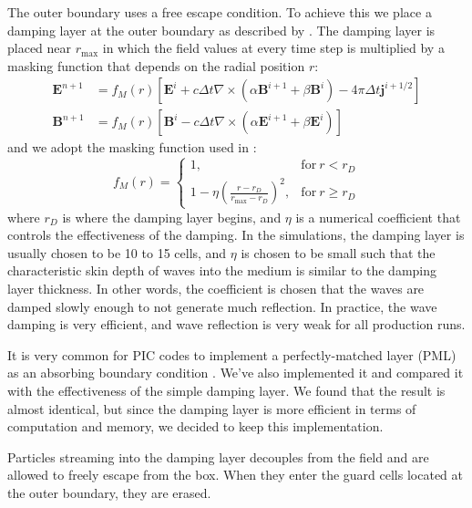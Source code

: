 The outer boundary uses a free escape condition. To achieve this we place a
damping layer at the outer boundary as described by \citet{umeda_improved_2001}.
The damping layer is placed near $r_\mathrm{max}$ in which the field values at
every time step is multiplied by a masking function that depends on the radial
position $r$:
\begin{align}
  \mathbf{E}^{n+1} &= f_M(r) \left[ \mathbf{E}^i + c\Delta t\nabla \times \left( \alpha
                     \mathbf{B}^{i+1} + \beta \mathbf{B}^i \right) - 4\pi
                     \Delta t\mathbf{j}^{i+1/2} \right] \\
  \mathbf{B}^{n+1} &= f_{M}(r) \left[ \mathbf{B}^i - c\Delta t\nabla \times \left(
                     \alpha \mathbf{E}^{i+1} + \beta \mathbf{E}^i \right) \right]
\end{align}
and we adopt the masking function used in \citep{umeda_improved_2001}:
\begin{equation}
  \label{eq:masking-function}
  f_M(r) =
  \begin{cases}
    \displaystyle 1, & \mathrm{for\ }r < r_D \\
    \displaystyle 1 - \eta\left( \frac{r - r_D}{r_\mathrm{max} - r_D} \right)^2, & \mathrm{for\ }r \geq r_{D}
  \end{cases}
\end{equation}
where $r_{D}$ is where the damping layer begins, and $\eta$ is a numerical
coefficient that controls the effectiveness of the damping. In the simulations,
the damping layer is usually chosen to be 10 to 15 cells, and $\eta$ is chosen
to be small such that the characteristic skin depth of waves into the medium is
similar to the damping layer thickness. In other words, the coefficient is
chosen that the waves are damped slowly enough to not generate much reflection.
In practice, the wave damping is very efficient, and wave reflection is very
weak for all production runs.

It is very common for PIC codes to implement a perfectly-matched layer (PML) as
an absorbing boundary condition \citep{berenger_perfectly_1994}. We've also
implemented it and compared it with the effectiveness of the simple damping
layer. We found that the result is almost identical, but since the damping layer
is more efficient in terms of computation and memory, we decided to keep this
implementation.

Particles streaming into the damping layer decouples from the field and are
allowed to freely escape from the box. When they enter the guard cells located at
the outer boundary, they are erased.



